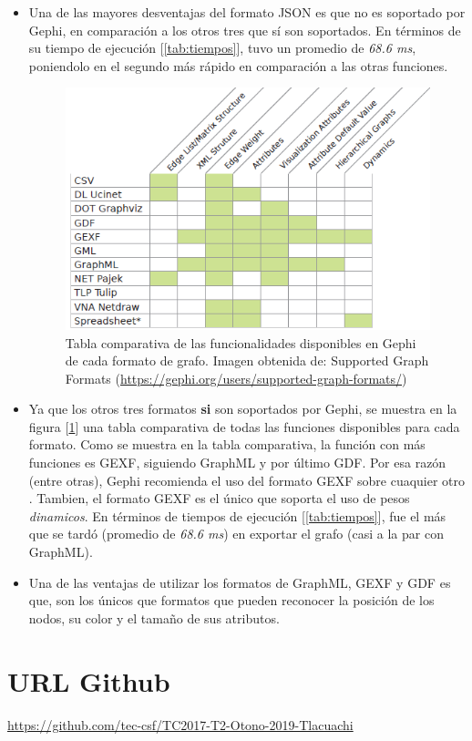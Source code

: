 \documentclass[acmlarge,screen]{acmart}
\begin{document}
\begin{itemize}
\item Una de las mayores desventajas del formato JSON es que no es soportado por Gephi, en comparación a los otros tres que sí son soportados. En términos de su tiempo de ejecución [\ref{tab:tiempos}], tuvo un promedio de {\it 68.6 ms}, poniendolo en el segundo más rápido en comparación a las otras funciones.
 \begin{figure}[h!]
 \includegraphics[scale=0.8]{graph-format-table-comparison.png}
 \caption{Tabla comparativa de las funcionalidades disponibles en Gephi de cada formato de grafo. Imagen obtenida de: Supported Graph Formats (\url{https://gephi.org/users/supported-graph-formats/})}
 \label{fig:gephitable}
 \end{figure}
 \item Ya que los otros tres formatos {\bf si} son soportados por Gephi, se muestra en la figura [\ref{fig:gephitable}] una tabla comparativa de todas las funciones disponibles para cada formato. Como se muestra en la tabla comparativa, la función con más funciones es GEXF, siguiendo GraphML y por último GDF. Por esa razón (entre otras), Gephi recomienda el uso del formato GEXF sobre cuaquier otro \cite{Gephi}. Tambien, el formato GEXF es el único que soporta el uso de pesos {\it dinamicos}. En términos de tiempos de ejecución [\ref{tab:tiempos}], fue el más que se tardó (promedio de {\it 68.6 ms})  en exportar el grafo (casi a la par con GraphML).
 \item Una de las ventajas de utilizar los formatos de GraphML, GEXF y GDF es que, son los únicos que formatos que pueden reconocer la posición de los nodos, su color y el tamaño de sus atributos.
\end{itemize}



\section{URL Github}
\url{https://github.com/tec-csf/TC2017-T2-Otono-2019-Tlacuachi}
\end{document}
